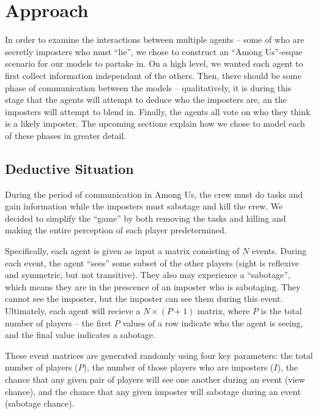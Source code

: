 \documentclass[10pt,twocolumn,letterpaper]{article}
\begin{document}
\section{Approach}
In order to examine the interactions between multiple agents -- some of who are
secretly imposters who must ``lie'', we chose to construct an ``Among Us''-esque scenario
for our models to partake in. On a high level, we wanted each agent to 
first collect information
independant of the others. Then, there should be some phase of communication between the
models -- qualitatively, it is during this stage that the agents will attempt to
deduce who the imposters are, an the imposters will attempt to blend in. Finally, the
agents all vote on who they think is a likely imposter. The upcoming sections
explain how we chose to model each of these phases in greater detail.
\subsection{Deductive Situation}
During the period of communication in Among Us, the crew must do tasks
and gain information while the imposters must sabotage and kill the crew. We decided
to simplify the ``game'' by both removing the tasks and killing and making the entire
perception of each player predetermined. 

Specifically, each agent is given as input a matrix consisting
of $N$ events. During each event, the agent ``sees'' some subset of the other players
(sight is reflexive and symmetric, but not transitive).
They also may experience a ``sabotage'', which means they are in the prescence
of an imposter who is sabotaging. They cannot see the imposter, but the imposter
can see them during this event. Ultimately, each agent will recieve
a $N \times (P + 1)$ matrix, where $P$ is the total number of players -- the first
$P$ values of a row indicate who the agent is seeing, and the final value indicates
a sabotage.

These event matrices are generated randomly using four key parameters: the total number
of players ($P$), the number of those players who are imposters ($I$), the chance that
any given pair of players will see one another during an event (view chance), and the 
chance that any given imposter will sabotage during an  event (sabotage chance).
\end{document}
